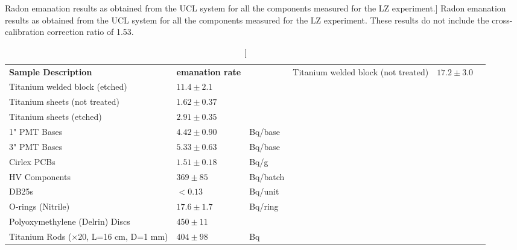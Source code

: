 \begin{table}[h!]
\centering
\caption
[Radon emanation results as obtained from the UCL system for all the components measured for the LZ experiment.]
{Radon emanation results as obtained from the UCL system for all the components measured for the LZ experiment. These results do not include the cross-calibration correction ratio of 1.53.}
\label{tab:ucl_emanation_results}
\vspace{1mm}
\renewcommand{\arraystretch}{1.2}
    \begin{tabularx}{1\linewidth}{@{\extracolsep{\fill}}lll}
    \toprule
    \textbf{Sample Description} & %
    \textbf{\RnTTT{} emanation rate} & %
    \textbf{} & %
    \hline
    \hline
    Titanium welded block (not treated) & $17.2\pm3.0$  & \mBqms{} \\
    Titanium welded block (etched)      & $11.4\pm2.1$  & \mBqms{} \\
    Titanium sheets (not treated)       & $1.62\pm0.37$ & \mBqms{} \\
    Titanium sheets (etched)            & $2.91\pm0.35$ & \mBqms{} \\  
    1" PMT Bases                        & $4.42\pm0.90$ & \micro{}Bq/base \\ 
    3" PMT Bases                        & $5.33\pm0.63$ & \micro{}Bq/base \\ 
    Cirlex PCBs                         & $1.51\pm0.18$ & \micro{}Bq/g \\ 
    HV Components                       & $369\pm85$    & \micro{}Bq/batch \\ 
    DB25s                               & $<0.13$    & \micro{}Bq/unit \\ 
    O-rings (Nitrile)                   & $17.6\pm1.7$    & \micro{}Bq/ring \\ 
    Polyoxymethylene (Delrin) Discs     & $450\pm11$    & \uBqms{} \\ 
    Titanium Rods ($\times$20, L=16 cm, D=1 mm)    & $404\pm98$    & \micro{}Bq \\ 
    \bottomrule
    \end{tabularx}
\end{table}